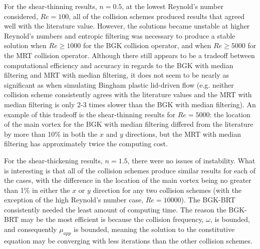 For the shear-thinning results, $n = 0.5$, at the lowest Reynold's number considered, $Re = 100$, all of the collision schemes produced results that agreed well with the literature value.
However, the solutions became unstable at higher Reynold's numbers and entropic filtering was necessary to produce a stable solution when $Re \ge 1000$ for the BGK collision operator, and when $Re \ge 5000$ for the MRT collision operator.
Although there still appears to be a tradeoff between computational efficiency and accuracy in regards to the BGK with median filtering and MRT with median filtering, it does not seem to be nearly as significant as when simulating Bingham plastic lid-driven flow (e.g. neither collision scheme consistently agrees with the literature values and the MRT with median filtering is only 2-3 times slower than the BGK with median filtering).
An example of this tradeoff is the shear-thinning results for $Re = 5000$: the location of the main vortex for the BGK with median filtering differed from the literature by more than 10\% in both the $x$ and $y$ directions, but the MRT with median filtering has approximately twice the computing cost.

For the shear-thickening results, $n = 1.5$, there were no issues of instability.
What is interesting is that all of the collision schemes produce similar results for each of the cases, with the difference in the location of the main vortex being no greater than 1\% in either the $x$ or $y$ direction for any two collision schemes (with the exception of the high Reynold's number case, $Re = 10000$).
The BGK-BRT consistently needed the least amount of computing time.
The reason the BGK-BRT may be the most efficient is because the collision frequency, $\omega$, is bounded, and consequently $\mu_{app}$ is bounded, meaning the solution to the constitutive equation may be converging with less iterations than the other collision schemes.

